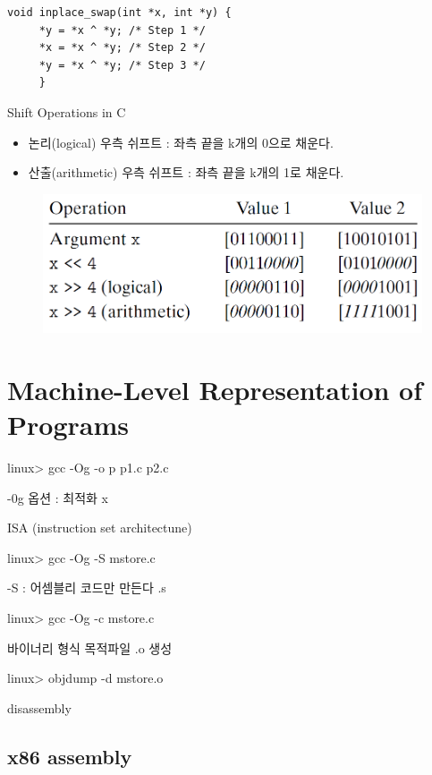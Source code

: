 \documentclass[chapter,oneside]{oblivoir}
\begin{document}
\begin{lstlisting}[style = CStyle]
    void inplace_swap(int *x, int *y) {
     *y = *x ^ *y; /* Step 1 */
     *x = *x ^ *y; /* Step 2 */
     *y = *x ^ *y; /* Step 3 */
     }
    \end{lstlisting}
    
    
    Shift Operations in C
    
    \begin{itemize}
        \item  논리(logical) 우측 쉬프트 : 좌측 끝을 k개의 0으로 채운다.
        \item  산출(arithmetic) 우측 쉬프트 : 좌측 끝을 k개의 1로 채운다.
    \end{itemize}
    
    \begin{figure}[h!]
        \centering
        \includegraphics[scale=0.4]{pic/shift}
    \end{figure}
    



\chapter{Machine-Level Representation of Programs}


linux> gcc -Og -o p p1.c p2.c


-0g 옵션 : 최적화 x

ISA (instruction set architectune)

linux> gcc -Og -S mstore.c

-S : 어셈블리 코드만 만든다 .s

linux> gcc -Og -c mstore.c

바이너리 형식 목적파일 .o  생성


linux> objdump -d mstore.o

disassembly


\section{x86 assembly}
\end{document}
